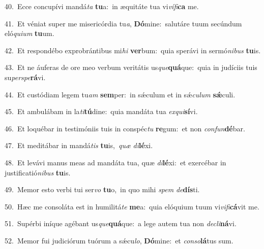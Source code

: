 {\numbfont\textcolor{\numbcolor}{40.}}~Ecce concupívi mandá\textit{ta} \textbf{tu}\-a:~\star in æquitáte tua vi\-\textit{ví}\-\textit{fi}\textbf{ca} me.\par
{\numbfont\textcolor{\numbcolor}{41.}}~Et véniat super me misericórdia tu\-\textit{a}\-, \textbf{Dó}\-mine:~\star salutáre tuum secúndum eló\-\textit{qui}\-\textit{um} \textbf{tu}\-um.\par
{\numbfont\textcolor{\numbcolor}{42.}}~Et respondébo exprobrántibus mi\textit{hi} \textbf{ver}\-bum:~\star quia sperávi in sermó\-\textit{ni}\-\textit{bus} \textbf{tu}\-is.\par
{\numbfont\textcolor{\numbcolor}{43.}}~Et ne áuferas de ore meo verbum veritátis us\-\textit{que}\-\textbf{quá}que:~\star quia in judíciis tuis su\-\textit{per}\-\textit{spe}\textbf{rá}vi.\par
{\numbfont\textcolor{\numbcolor}{44.}}~Et custódiam legem tu\textit{am} \textbf{sem}\-per:~\star in sǽculum et in sǽ\-\textit{cu}\-\textit{lum} \textbf{sǽ}\-culi.\par
{\numbfont\textcolor{\numbcolor}{45.}}~Et ambulábam in la\-\textit{ti}\-\textbf{tú}dine:~\star quia mandáta tua \textit{ex}\-\textit{qui}\textbf{sí}vi.\par
{\numbfont\textcolor{\numbcolor}{46.}}~Et loquébar in testimóniis tuis in conspéc\textit{tu} \textbf{re}\-gum:~\star et non \textit{con}\-\textit{fun}\textbf{dé}bar.\par
{\numbfont\textcolor{\numbcolor}{47.}}~Et meditábar in mandá\textit{tis} \textbf{tu}\-is,~\star \textit{quæ} \textit{di}\-\textbf{lé}xi.\par
{\numbfont\textcolor{\numbcolor}{48.}}~Et levávi manus meas ad mandáta tua, quæ \textit{di}\-\textbf{lé}xi:~\star et exercébar in justificatió\-\textit{ni}\-\textit{bus} \textbf{tu}\-is.\par
{\numbfont\textcolor{\numbcolor}{49.}}~Memor esto verbi tui ser\textit{vo} \textbf{tu}\-o,~\star in quo mihi \textit{spem} \textit{de}\-\textbf{dís}ti.\par
{\numbfont\textcolor{\numbcolor}{50.}}~Hæc me consoláta est in humilitá\textit{te} \textbf{me}\-a:~\star quia elóquium tuum vi\-\textit{vi}\-\textit{fi}\textbf{cá}vit me.\par
{\numbfont\textcolor{\numbcolor}{51.}}~Supérbi iníque agébant us\-\textit{que}\-\textbf{quá}que:~\star a lege autem tua non \textit{de}\-\textit{cli}\textbf{ná}vi.\par
{\numbfont\textcolor{\numbcolor}{52.}}~Memor fui judiciórum tuórum a sǽcu\-\textit{lo}\-, \textbf{Dó}\-mine:~\star et \textit{con}\-\textit{so}\textbf{lá}tus sum.\par
